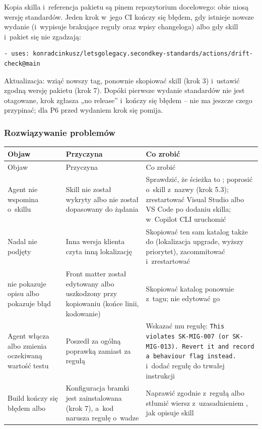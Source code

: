 Kopia skilla i~referencja pakietu są pinem repozytorium docelowego: obie niosą wersję
standardów. Jeden krok w~jego CI kończy się błędem, gdy istnieje nowsze wydanie (i~wypisuje
brakujące reguły oraz wpisy changeloga) albo gdy skill i~pakiet się nie zgadzają:

\begin{lstlisting}
- uses: konradcinkusz/letsgolegacy.secondkey-standards/actions/drift-check@main
\end{lstlisting}

Aktualizacja: wziąć nowszy tag, ponownie skopiować skill (krok 3) i~ustawić zgodną wersję
pakietu (krok 7). Dopóki pierwsze wydanie standardów nie jest otagowane, krok zgłasza „no
release” i~kończy się błędem -- nie ma jeszcze czego przypinać; dla P6 przed wydaniem krok
się pomija.

\subsubsection{Rozwiązywanie problemów}

\begin{xltabular}{\linewidth}{@{}>{\raggedright\arraybackslash}p{4.6cm} >{\raggedright\arraybackslash}p{3.6cm} >{\raggedright\arraybackslash}X@{}}
\toprule
Objaw & Przyczyna & Co zrobić \\
\midrule
\endfirsthead
\toprule
Objaw & Przyczyna & Co zrobić \\
\midrule
\endhead
Agent nie wspomina o~skillu & Skill nie został wykryty albo nie został dopasowany do żądania & Sprawdzić, że ścieżka to ; poprosić o~skill z~nazwy (krok 5.3); zrestartować Visual Studio albo VS Code po dodaniu skilla; w~Copilot CLI uruchomić  \\
Nadal nie podjęty & Inna wersja klienta czyta inną lokalizację & Skopiować ten sam katalog także do  (lokalizacja upgrade, wyższy priorytet), zacommitować i~zrestartować \\
 nie pokazuje opisu albo pokazuje błąd & Front matter został edytowany albo uszkodzony przy kopiowaniu (końce linii, kodowanie) & Skopiować katalog ponownie z~tagu; nie edytować go \\
Agent włącza  albo zmienia oczekiwaną wartość testu & Poszedł za ogólną poprawką zamiast za regułą & Wskazać mu regułę: \texttt{This violates SK-MIG-007 (or SK-MIG-013). Revert it and record a behaviour flag instead.} i~dodać regułę do trwałej instrukcji \\
Build kończy się błędem  albo  & Konfiguracja bramki jest zainstalowana (krok 7), a~kod narusza regułę o~wadze  & Naprawić zgodnie z~regułą albo stłumić wiersz z~uzasadnieniem , jak opisuje skill \\
\bottomrule
\end{xltabular}

